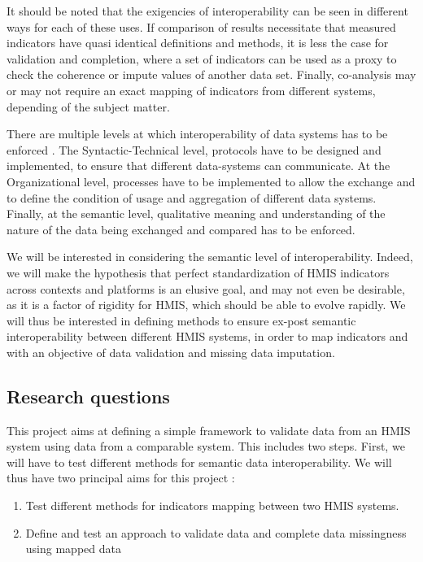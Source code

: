 \documentclass[a4paper,11pt,draft,twoside]{article}
\begin{document}
It should be noted that the exigencies of interoperability can be seen in different ways for each of these uses. If comparison of results necessitate that measured indicators have quasi identical definitions and methods, it is less the case for validation and completion, where a set of indicators can be used as a proxy to check the coherence or impute values of another data set. Finally, co-analysis may or may not require an exact mapping of indicators from different systems, depending of the subject matter.

There are multiple levels at which interoperability of data systems  has to be enforced \cite{braa_sahay_book}. The Syntactic-Technical level, protocols have to be designed and implemented, to ensure that different data-systems can communicate. At the Organizational level, processes have to be implemented to allow the exchange and to define the condition of usage and aggregation of different data systems. Finally, at the semantic level, qualitative meaning and understanding of the nature of the data being exchanged and compared has to be enforced.

We will be interested in considering the semantic level of interoperability. Indeed, we will make the hypothesis that perfect standardization of HMIS indicators across contexts and platforms is an elusive goal, and may not even be desirable, as it is a factor of rigidity for HMIS, which should be able to evolve rapidly. We will thus be interested in defining methods to ensure ex-post semantic interoperability between different HMIS systems, in order to map indicators and with an objective of data validation and missing data imputation.

\subsection{Research questions}

This project aims at defining a simple framework to validate data from an HMIS system using data from a comparable system. This includes two steps. First, we will have to test different methods for semantic data interoperability. We will thus have two principal aims for this project :

\begin{enumerate}
\item Test different methods for indicators mapping between two HMIS systems.
\item Define and test an approach to validate data and complete data missingness using mapped data
\end{enumerate}
\end{document}

